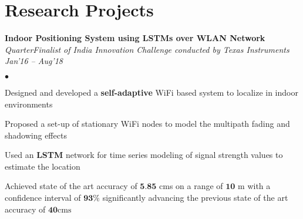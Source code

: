 \documentclass[margin,line, 9pt]{res}
\newenvironment{list2}{
  \begin{list}{$\bullet$}{%
      \setlength{\itemsep}{0.03in}
      \setlength{\parsep}{0in} \setlength{\parskip}{0in}
      \setlength{\topsep}{0in} \setlength{\partopsep}{0in} 
      \setlength{\leftmargin}{0.2in}}}{\end{list}}
\begin{document}
\section{\sc Research Projects}
{\bf Indoor Positioning System using LSTMs over WLAN Network} \\
{\em QuarterFinalist of India Innovation Challenge conducted by Texas Instruments} \hfill{\it Jan'16 -- Aug'18} \\
\vspace*{-.13in}
\begin{list2}
\item Designed and developed a \textbf{self-adaptive} WiFi based system to localize in indoor environments
\item Proposed a set-up of stationary WiFi nodes to model the multipath fading and shadowing effects
\item Used an \textbf{LSTM} network for time series modeling of signal strength values to estimate the location
\item Achieved state of the art accuracy of $\textbf{5.85}$ cms on a range of $\textbf{10}$ m with a confidence interval of $\textbf{93\%}$ significantly advancing the previous state of the art accuracy of $\textbf{40}\text{cms}$
%
\end{list2}
%
\end{document}
